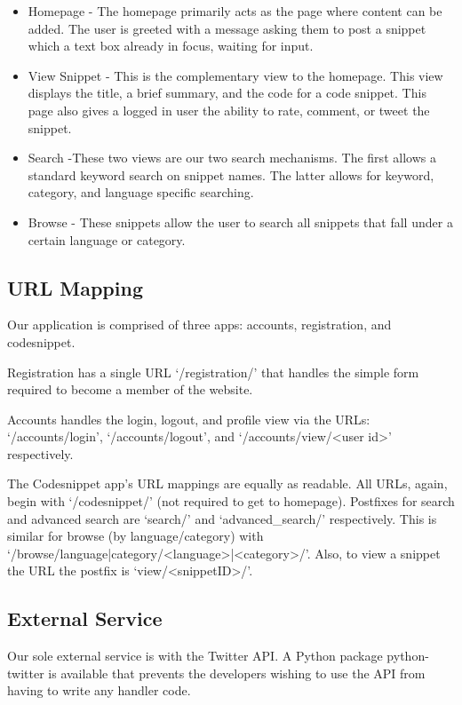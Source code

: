 \documentclass{sig-alt-release2}
\begin{document}
\begin{itemize}
\item Homepage - The homepage primarily acts as the page where content
can be added. The user is greeted with a message asking them to post a snippet
which a text box already in focus, waiting for input.

\item View Snippet - This is the complementary view to the 
homepage. This view displays the title, a brief summary, and the code for a 
code snippet. This page also gives a logged in user the ability to rate,
comment, or tweet the snippet.

\item Search  -These two views are our
two search mechanisms. The first allows a standard keyword search on snippet
names. The latter allows for keyword, category, and language specific searching.

\item Browse -
These snippets allow the user to search all snippets that fall under a certain
language or category.
\end{itemize}

\subsection{URL Mapping}

Our application is comprised of three apps: accounts, registration, and
codesnippet. 

Registration has a single URL `/registration/' that handles the
simple form required to become a member of the website.

Accounts handles the login, logout, and profile view via the URLs:
`/accounts/login', `/accounts/logout', and `/accounts/view/<user id>'
respectively.

The Codesnippet app's URL mappings are equally as readable. All URLs, again,
begin with `/codesnippet/' (not required to get to homepage). Postfixes for
search and advanced search are `search/' and `advanced\_search/' respectively.
This is similar for browse (by language/category) with
 `/browse/language|category/<language>|<category>/'. Also, to view a snippet
the URL the postfix is `view/<snippetID>/'.

\subsection{External Service}

Our sole external service is with the Twitter API. A Python package
python-twitter is available that prevents the developers wishing to use the
API from having to write any handler code.
\end{document}
